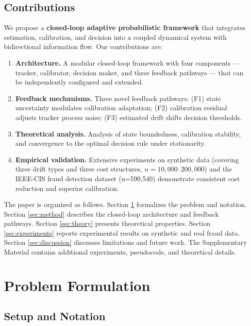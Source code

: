 \documentclass[12pt,a4paper]{article}
\begin{document}
\subsection{Contributions}

We propose a \textbf{closed-loop adaptive probabilistic framework} that integrates estimation, calibration, and decision into a coupled dynamical system with bidirectional information flow. Our contributions are:

\begin{enumerate}
    \item \textbf{Architecture.} A modular closed-loop framework with four components --- tracker, calibrator, decision maker, and three feedback pathways --- that can be independently configured and extended.
    \item \textbf{Feedback mechanisms.} Three novel feedback pathways: (F1) state uncertainty modulates calibration adaptation; (F2) calibration residual adjusts tracker process noise; (F3) estimated drift shifts decision thresholds.
    \item \textbf{Theoretical analysis.} Analysis of state boundedness, calibration stability, and convergence to the optimal decision rule under stationarity.
    \item \textbf{Empirical validation.} Extensive experiments on synthetic data (covering three drift types and three cost structures, $n=10{,}000$--$200{,}000$) and the IEEE-CIS fraud detection dataset (n=590,540) demonstrate consistent cost reduction and superior calibration.
\end{enumerate}

The paper is organized as follows. Section \ref{sec:problem} formalizes the problem and notation. Section \ref{sec:method} describes the closed-loop architecture and feedback pathways. Section \ref{sec:theory} presents theoretical properties. Section \ref{sec:experiments} reports experimental results on synthetic and real fraud data. Section \ref{sec:discussion} discusses limitations and future work. The Supplementary Material contains additional experiments, pseudocode, and theoretical details.

\section{Problem Formulation}
\label{sec:problem}

\subsection{Setup and Notation}
\end{document}
